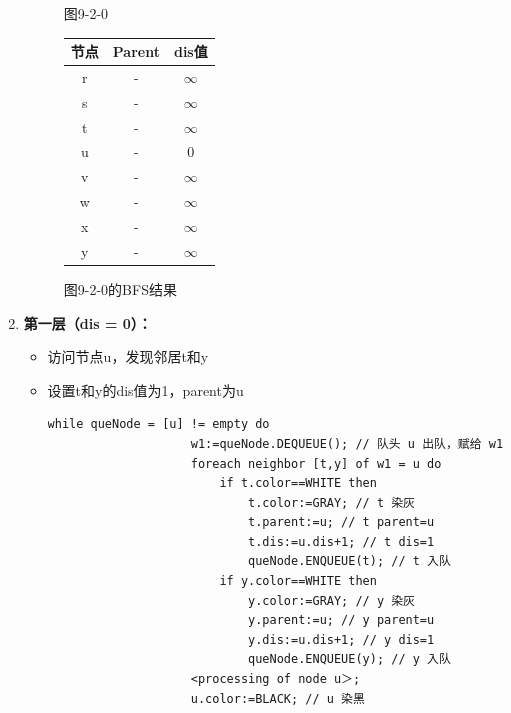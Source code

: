 \documentclass{article}
\begin{document}
\begin{enumerate}
\begin{figure}[htbp]
\begin{minipage}[b]{0.6\textwidth}
    \caption{图9-2-0}
    \label{fig:9-2-0}
    \end{minipage}%
    \hfill%
    \begin{minipage}[b]{0.4\textwidth}    %
        \centering
        \begin{tabular}{|c|c|c|}
            \hline
            节点 & Parent & dis值 \\
            \hline
            r & - & $\infty$ \\
            s & - & $\infty$ \\
            t & - & $\infty$ \\
            u & - & 0 \\
            v & - & $\infty$ \\
            w & - & $\infty$ \\
            x & - & $\infty$ \\
            y & - & $\infty$ \\
            \hline
        \end{tabular}
        \caption{图9-2-0的BFS结果}
        \label{tab:graph9-2-0-bfs}
    \end{minipage}
    \end{figure}
    
    \pagebreak
    
    \item \textbf{第一层（dis = 0）：}
    \begin{itemize}
        \item 访问节点u，发现邻居t和y
        \item 设置t和y的dis值为1，parent为u

        \begin{lstlisting}[style=algorithmPPT]
                while queNode = [u] != empty do
                    w1:=queNode.DEQUEUE(); // 队头 u 出队，赋给 w1
                    foreach neighbor [t,y] of w1 = u do
                        if t.color==WHITE then
                            t.color:=GRAY; // t 染灰
                            t.parent:=u; // t parent=u
                            t.dis:=u.dis+1; // t dis=1
                            queNode.ENQUEUE(t); // t 入队
                        if y.color==WHITE then
                            y.color:=GRAY; // y 染灰
                            y.parent:=u; // y parent=u
                            y.dis:=u.dis+1; // y dis=1
                            queNode.ENQUEUE(y); // y 入队
                    <processing of node u＞;
                    u.color:=BLACK; // u 染黑
                \end{lstlisting}
    \end{itemize}


\end{enumerate}
\end{document}
